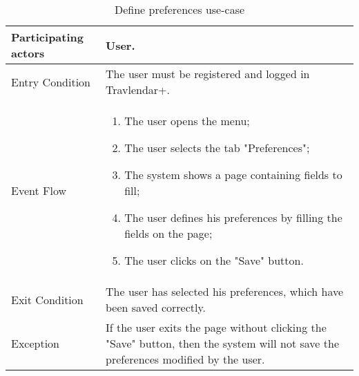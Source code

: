 \begin{table}[H]
	\begin{center}
		\begin{tabular}{ | p{} | p{} | }
		\hline
		Participating actors & User.\\
		\hline
		Entry Condition & The user must be registered and logged in Travlendar+.\\
		\hline
		Event Flow & 
			\begin{enumerate}
				\item The user opens the menu;
				\item The user selects the tab "Preferences";
				\item The system shows a page containing fields to fill;
				\item The user defines his preferences by filling the fields on the page;
				\item The user clicks on the "Save" button.
			\end{enumerate} \\
		\hline
		Exit Condition & The user has selected his preferences, which have been saved correctly.\\
		\hline
		Exception & If the user exits the page without clicking the "Save" button, then the system will not save the preferences modified by the user.\\ 
		\hline
		\end{tabular}
	\end{center}
	\caption{Define preferences use-case}
\end{table}